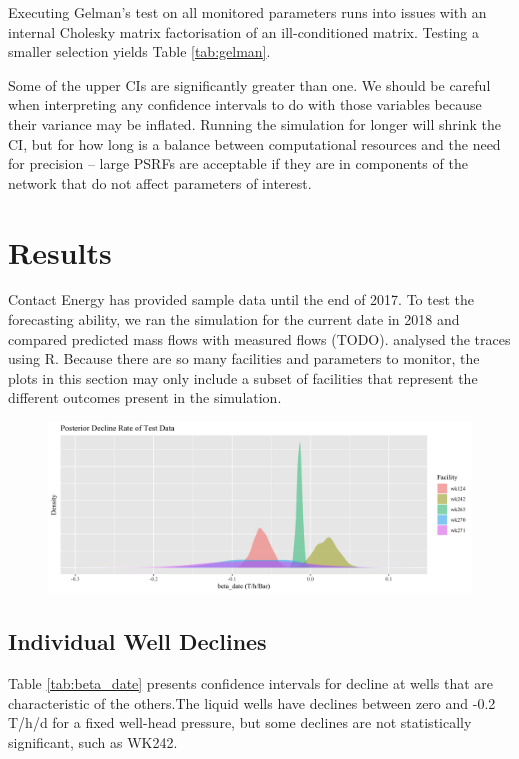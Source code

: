 \documentclass[a4paper, 12pt]{article}
\begin{document}
Executing Gelman's test on all monitored parameters runs into issues with an internal Cholesky matrix factorisation of an ill-conditioned matrix. Testing a smaller selection yields Table \ref{tab:gelman}.


Some of the upper CIs are significantly greater than one. We should be careful when interpreting any confidence intervals to do with those variables because their variance may be inflated. Running the simulation for longer will shrink the CI, but for how long is a balance between computational resources and the need for precision -- large PSRFs are acceptable if they are in components of the network that do not affect parameters of interest.

\section{Results}
Contact Energy has provided sample data until the end of 2017. To test the forecasting ability, we ran the simulation for the current date in 2018 and compared predicted mass flows with measured flows (TODO). analysed the traces using R. Because there are so many facilities and parameters to monitor, the plots in this section may only include a subset of facilities that represent the different outcomes present in the simulation.

\begin{figure}
  \centering
  \includegraphics[width=\linewidth]{media/beta_date}
  \label{fig:beta_date}
\end{figure}

\subsection{Individual Well Declines}



Table \ref{tab:beta_date} presents confidence intervals for decline at wells that are characteristic of the others.The liquid wells have declines between zero and -0.2 T/h/d for a fixed well-head pressure, but some declines are not statistically significant, such as WK242.
\end{document}
